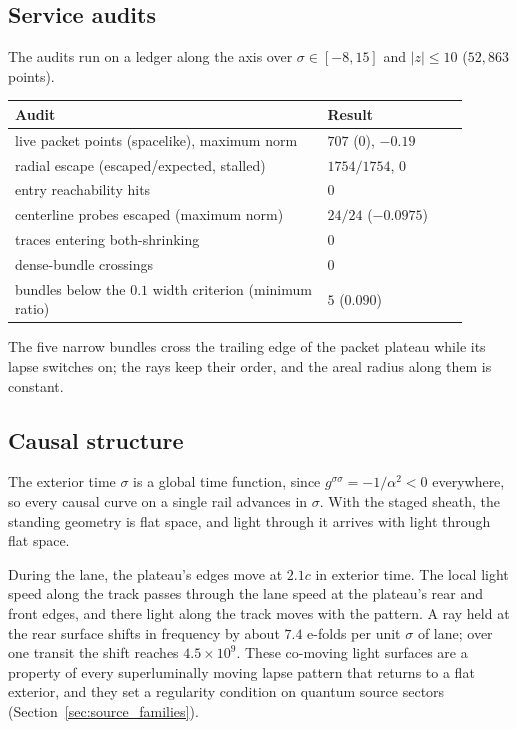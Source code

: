 \documentclass[11pt]{article}
\newcommand{\sig}{\sigma}
\begin{document}
\subsection{Service audits}

The audits run on a ledger along the axis over $\sig\in[-8,15]$ and $|z|\le10$ ($52{,}863$ points).
\begin{longtable}{L{0.62\linewidth}L{0.28\linewidth}}
\toprule
\textbf{Audit} & \textbf{Result} \\
\midrule
live packet points (spacelike), maximum norm & $707$ ($0$), $-0.19$ \\
radial escape (escaped/expected, stalled) & $1754/1754$, $0$ \\
entry reachability hits & $0$ \\
centerline probes escaped (maximum norm) & $24/24$ ($-0.0975$) \\
traces entering both-shrinking & $0$ \\
dense-bundle crossings & $0$ \\
bundles below the $0.1$ width criterion (minimum ratio) & $5$ ($0.090$) \\
\bottomrule
\end{longtable}
The five narrow bundles cross the trailing edge of the packet plateau while its lapse switches on; the rays keep their order, and the areal radius along them is constant.

\subsection{Causal structure}

The exterior time $\sig$ is a global time function, since $g^{\sig\sig}=-1/\alpha^2<0$ everywhere, so every causal curve on a single rail advances in $\sig$. With the staged sheath, the standing geometry is flat space, and light through it arrives with light through flat space.

During the lane, the plateau's edges move at $2.1c$ in exterior time. The local light speed along the track passes through the lane speed at the plateau's rear and front edges, and there light along the track moves with the pattern. A ray held at the rear surface shifts in frequency by about $7.4$ e-folds per unit $\sig$ of lane; over one transit the shift reaches $4.5\times10^{9}$. These co-moving light surfaces are a property of every superluminally moving lapse pattern that returns to a flat exterior, and they set a regularity condition on quantum source sectors (Section~\ref{sec:source_families}).
\end{document}
